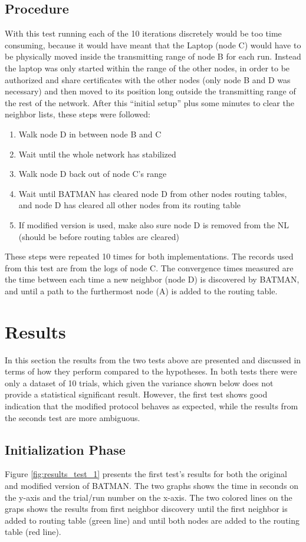 \subsection{Procedure}
With this test running each of the 10 iterations discretely would be too time
consuming, because it would have meant that the Laptop (node C) would have to be
physically moved inside the transmitting range of node B for each run. Instead
the laptop was only started within the range of the other nodes, in order to be
authorized and share certificates with the other nodes (only node B and D was
necessary) and then moved to its position long outside the transmitting range of
the rest of the network. After this ``initial setup'' plus some minutes to
clear the neighbor lists, these steps were followed:
\begin{enumerate}
  \item Walk node D in between node B and C
  \item Wait until the whole network has stabilized
  \item Walk node D back out of node C's range
  \item Wait until BATMAN has cleared node D from other nodes routing tables,
  and node D has cleared all other nodes from its routing table
  \item If modified version is used, make also sure node D is removed from the
  \ac{NL} (should be before routing tables are cleared)
\end{enumerate}
These steps were repeated 10 times for both implementations. The records used
from this test are from the logs of node C. The convergence times measured
are the time between each time a new neighbor (node D) is discovered by BATMAN,
and until a path to the furthermost node (A) is added to the routing table.


\section{Results}
In this section the results from the two tests above are presented and discussed
in terms of how they perform compared to the hypotheses. In both tests there
were only a dataset of 10 trials, which given the variance shown below does not
provide a statistical significant result. However, the first test shows good
indication that the modified protocol behaves as expected, while the results
from the seconds test are more ambiguous.

\subsection{Initialization Phase}
Figure \ref{fig:results_test_1} presents the first test's results for both the
original and modified version of BATMAN. The two graphs shows the time in
seconds on the y-axis and the trial/run number on the x-axis. The two colored
lines on the graps shows the results from first neighbor discovery until the
first neighbor is added to routing table (green line) and until both nodes are
added to the routing table (red line).

